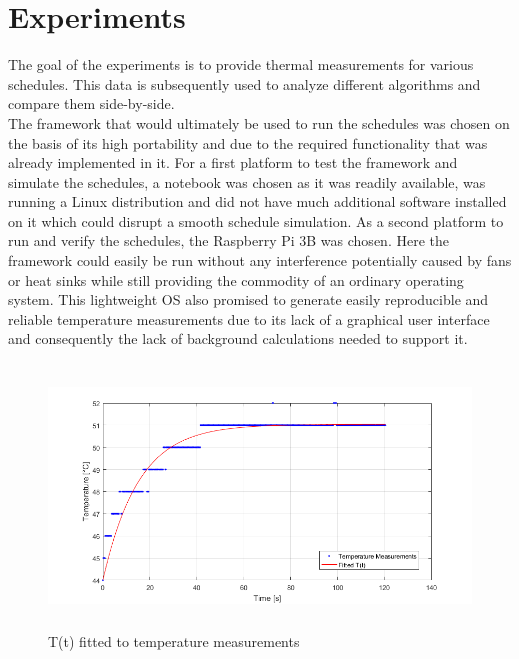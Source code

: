 \section{Experiments}\label{t_prof}
The goal of the experiments is to provide thermal measurements for various schedules. This data is subsequently used to analyze different algorithms and compare them side-by-side.\\
\hspace*{0.5ex}\hspace{0.5ex} The framework that would ultimately be used to run the schedules was chosen on the basis of its high portability and due to the required functionality that was already implemented in it. For a first platform to test the framework and simulate the schedules, a notebook was chosen as it was readily available, was running a Linux distribution and did not have much additional software installed on it which could disrupt a smooth schedule simulation.  As a second platform to run and verify the schedules, the Raspberry Pi 3B was chosen. Here the framework could easily be run without any interference potentially caused by fans or heat sinks while still providing the commodity of an ordinary operating system. This lightweight OS also promised to generate easily reproducible and reliable temperature measurements due to its lack of a graphical user interface and consequently the lack of background calculations needed to support it.\\
\begin{figure}[H]
  \centering
  \includegraphics[height=7cm]{figures/temp_fit}
  \caption[Function Fit]{T(t) fitted to temperature measurements}\label{fig:i_fit}
\end{figure}
